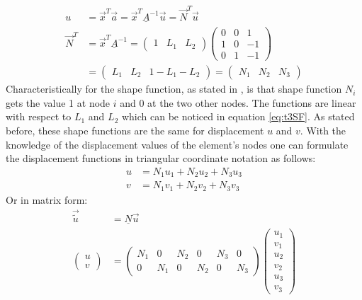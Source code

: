   \begin{align}\label{eq:t3SF}
  u &= \vec{x}^T \vec{a} = \vec{x}^T \underline{A}^{-1}\vec{u} = \vec{N}^T\vec{u} \nonumber\\
  \vec{N}^T &= \vec{x}^T \underline{A}^{-1} =
  \begin{pmatrix}
  1 & L_1 & L_2
  \end{pmatrix} \begin{pmatrix}
  0 & 0 & 1\\
  1 & 0 & -1\\
  0 & 1 & -1
  \end{pmatrix} \nonumber\\
  &= \begin{pmatrix}
  L_1 & L_2 & 1-L_1-L_2
  \end{pmatrix} = \begin{pmatrix}
  N_1 & N_2 & N_3
  \end{pmatrix}
  \end{align}
  Characteristically for the shape function, as stated in \cite{steinke2005finite}, is that shape function $N_i$ gets the value 1 at node $i$ and 0 at the two other nodes. The functions are linear with respect to $L_1$ and $L_2$ which can be noticed in equation \ref{eq:t3SF}. As stated before, these shape functions are the same for displacement $u$ and $v$. With the knowledge of the displacement values of the element's nodes one can formulate the displacement functions in triangular coordinate notation as follows:
  \begin{align}
  u &= N_1 u_1 + N_2 u_2 + N_3 u_3 \nonumber\\
  v &= N_1 v_1 + N_2 v_2 + N_3 v_3
  \end{align}
  Or in matrix form:
  \begin{align} \label{eq:t3u=Nu}
  \vec{\tilde{u}} &= \underline{N} \vec{u} \nonumber\\
  \begin{pmatrix}
  u \\ v
  \end{pmatrix} &= \begin{pmatrix}
  N_1 & 0 & N_2 & 0 & N_3 & 0 \\
  0 & N_1 & 0 & N_2 & 0 & N_3
  \end{pmatrix} \begin{pmatrix}
  u_1 \\ v_1 \\ u_2 \\ v_2 \\ u_3 \\ v_3
  \end{pmatrix}
  \end{align}
